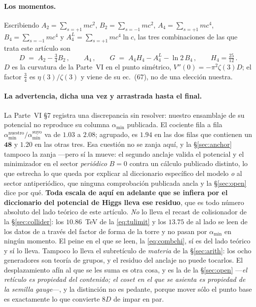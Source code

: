 \documentclass[11pt,a4paper]{article}
\newcommand{\rep}[1]{\mathbf{#1}}
\newcommand{\amin}{\alpha_{\min}}
\begin{document}
\paragraph{Los momentos.} Escribiendo $A_2=\sum_{s=+1} m c^2$, $B_2=\sum_{s=-1} m c^2$,
$A_4=\sum_{s=+1} m c^4$, $B_4=\sum_{s=-1} m c^4$ y $A_4^{L}=\sum_{s=+1} m c^4\ln c$, las tres
combinaciones de las que trata este artículo son
\begin{equation}\label{eq:moments}
  D \;=\; A_2-\tfrac34 B_2\,,\qquad
  A_4\,,\qquad
  G \;=\; A_4 H_4 - A_4^{L} - \ln 2\,B_4\,,\qquad H_4=\tfrac{25}{12}\,.
\end{equation}
$D$ es la curvatura de la Parte~VI en el punto simétrico, $V''(0)=-\pi^2\zeta(3)D$; el factor
$\tfrac34$ es $\eta(3)/\zeta(3)$ y viene de su ec.~(67), no de una elección nuestra.

\paragraph{La advertencia, dicha una vez y arrastrada hasta el final.} La Parte~VI \S7 registra una
discrepancia sin resolver: nuestro ensamblaje de su potencial no reproduce su columna $\amin$
publicada. El cociente fila a fila $\amin^{\text{nuestro}}/\amin^{\text{suyo}}$ va de $1.03$ a
$2.08$; agrupado, es $1.94$ en las dos filas que contienen un $\rep{48}$ y $1.20$ en las otras tres.
Esa cuestión no se zanja aquí, y la \S\ref{sec:anchor} tampoco la zanja ---pero sí la mueve: el
segundo anclaje valida el potencial y el minimizador en el sector \emph{periódico} $B=0$ contra un
cálculo publicado distinto, lo que estrecha lo que queda por explicar al diccionario específico del
modelo \emph{o} al sector antiperiódico, que ninguna comprobación publicada ancla y la
\S\ref{sec:open} dice por qué.
\textbf{Toda escala de aquí en adelante que se infiera por el diccionario del potencial de
Higgs lleva ese residuo}, que es todo número absoluto del lado teórico de este artículo.
\emph{No} lo lleva el recast de colisionador de la \S\ref{sec:collider}: los $10.86$~TeV de la
\eqref{eq:tulimit} y los $13.75$ de al lado se leen de los datos de \cite{CMSangular} a través
del factor de forma de la torre y no pasan por $\amin$ en ningún momento. El peine en el que se
leen, la \eqref{eq:combchi}, sí es del lado teórico y sí lo lleva. Tampoco lo lleva el
subretículo de \emph{materia} de la \S\ref{sec:arith}: los ocho generadores son teoría de grupos, y
el residuo del anclaje no puede tocarlos. El desplazamiento afín al que se les suma es otra cosa, y es la
de la \S\ref{sec:open} ---\emph{el retículo es propiedad del contenido; el coset en el que se
asienta es propiedad de la semilla gauge}---, y la distinción no es pedante, porque mover sólo el
punto base es exactamente lo que convierte $8D$ de impar en par.
\end{document}
